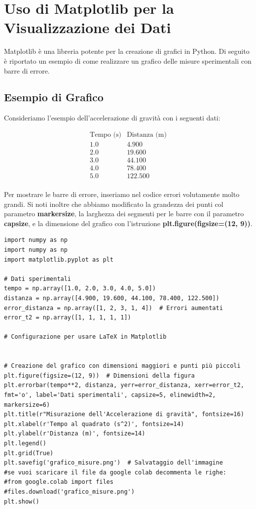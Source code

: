 \section{Uso di Matplotlib per la Visualizzazione dei Dati}

Matplotlib è una libreria potente per la creazione di grafici in Python. Di seguito è riportato un esempio di come realizzare un grafico delle misure sperimentali con barre di errore.

\subsection{Esempio di Grafico}

Consideriamo l'esempio dell'accelerazione di gravità con i seguenti dati:

\[
\begin{array}{c|c}
\text{Tempo (s)} & \text{Distanza (m)} \\
\hline
1.0 & 4.900 \\
2.0 & 19.600 \\
3.0 & 44.100 \\
4.0 & 78.400 \\
5.0 & 122.500 \\
\end{array}
\]

Per mostrare le barre di errore, inseriamo nel codice errori volutamente molto grandi. Si noti inoltre che abbiamo modificato la grandezza dei punti col parametro \textbf{markersize}, la larghezza dei segmenti per le barre con il parametro \textbf{capsize}, e la dimensione del grafico con l'istruzione \textbf{plt.figure(figsize=(12, 9))}.

\begin{lstlisting}[caption={Grafico delle misure sperimentali con barre di errore}]
import numpy as np
import numpy as np
import matplotlib.pyplot as plt

# Dati sperimentali
tempo = np.array([1.0, 2.0, 3.0, 4.0, 5.0])
distanza = np.array([4.900, 19.600, 44.100, 78.400, 122.500])
error_distanza = np.array([1, 2, 3, 1, 4])  # Errori aumentati
error_t2 = np.array([1, 1, 1, 1, 1])

# Configurazione per usare LaTeX in Matplotlib


# Creazione del grafico con dimensioni maggiori e punti più piccoli
plt.figure(figsize=(12, 9))  # Dimensioni della figura
plt.errorbar(tempo**2, distanza, yerr=error_distanza, xerr=error_t2, fmt='o', label='Dati sperimentali', capsize=5, elinewidth=2, markersize=6)
plt.title(r"Misurazione dell'Accelerazione di gravità", fontsize=16)
plt.xlabel(r'Tempo al quadrato (s^2)', fontsize=14)
plt.ylabel(r'Distanza (m)', fontsize=14)
plt.legend()
plt.grid(True)
plt.savefig('grafico_misure.png')  # Salvataggio dell'immagine
#se vuoi scaricare il file da google colab decommenta le righe:
#from google.colab import files
#files.download('grafico_misure.png')
plt.show()



\end{lstlisting}

